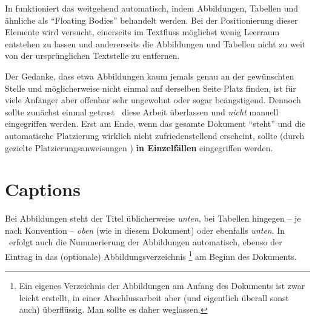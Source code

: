 In \latex funktioniert das weitgehend automatisch, indem
Abbildungen, Tabellen und ähnliche als "`Floating Bodies"'
behandelt werden. Bei der Positionierung dieser Elemente wird
versucht, einerseits im Textfluss möglichst wenig Leer\-raum
entstehen zu lassen und andererseits die Abbildungen und Tabellen
nicht zu weit von der ursprünglichen Textstelle zu entfernen.

Der Gedanke, dass etwa Abbildungen kaum jemals genau an der
ge\-wünsch\-ten Stelle und möglicherweise nicht einmal auf
derselben Seite Platz finden, ist für viele Anfänger aber offenbar sehr
ungewohnt oder sogar beängstigend. Dennoch sollte zunächst einmal
getrost \latex\ diese Arbeit überlassen und \emph{nicht} manuell
eingegriffen werden. Erst am Ende, wenn das gesamte Dokument "`steht"' und
die automatische Platzierung wirklich nicht zufriedenstellend erscheint, sollte (durch gezielte Platzierungsanweisungen
\cite[S.~49]{Oetiker2014}) \textbf{in Einzelfällen} eingegriffen werden.



\section{Captions}

Bei Abbildungen steht der Titel üblicherweise \emph{unten}, bei
Tabellen hingegen -- je nach Konvention -- \emph{oben} (wie in diesem Dokument) 
oder ebenfalls \emph{unten}. In \latex\ erfolgt
auch die Nummerierung der Abbildungen automatisch, ebenso der
Eintrag in das (optionale)
Abbildungsverzeichnis%
\footnote{Ein eigenes Verzeichnis der Abbildungen am Anfang des Dokuments
ist zwar leicht erstellt, in einer Abschlussarbeit aber (und eigentlich
überall sonst auch) überflüssig. Man sollte es daher weglassen.}
am Beginn des Dokuments.

